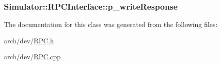 \hypertarget{class_simulator_1_1_r_p_c_interface_a30ee8b18387a9c7cec8a5becedb73f01}{
\subsubsection[{p\+\_\+write\+Response}]{ Simulator\+::\+R\+P\+C\+Interface\+::p\+\_\+write\+Response}}\label{class_simulator_1_1_r_p_c_interface_a30ee8b18387a9c7cec8a5becedb73f01}


The documentation for this class was generated from the following files\+:\begin{DoxyCompactItemize}
\item 
arch/dev/\hyperlink{_r_p_c_8h}{R\+P\+C.\+h}\item 
arch/dev/\hyperlink{_r_p_c_8cpp}{R\+P\+C.\+cpp}\end{DoxyCompactItemize}
